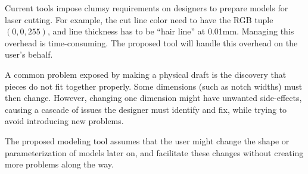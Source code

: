 \documentclass[12pt]{article}
\begin{document}
Current tools impose clumsy requirements on designers to prepare
models for laser cutting. For example, the cut line color need to have
the RGB tuple $(0,0,255)$, and line thickness has to be ``hair line''
at 0.01mm. Managing this overhead is time-consuming. The proposed tool
will handle this overhead on the user's behalf.

A common problem exposed by making a physical draft is the discovery
that pieces do not fit together properly. Some dimensions (such as
notch widths) must then change. However, changing one dimension might
have unwanted side-effects, causing a cascade of issues the designer
must identify and fix, while trying to avoid introducing new problems.

The proposed modeling tool assumes that the user might change the
shape or parameterization of models later on, and facilitate these
changes without creating more problems along the way. 



\end{document}
